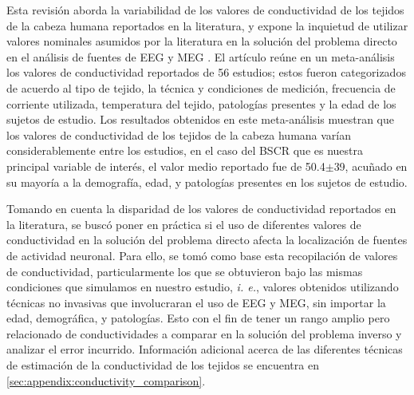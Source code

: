 Esta revisión aborda la variabilidad de los valores de conductividad de los tejidos de la cabeza humana reportados en la literatura, y expone la inquietud  de utilizar valores nominales asumidos por la literatura en la solución del problema directo en el análisis de fuentes de EEG y MEG \cite{McCann2019}.
El artículo reúne en un meta-análisis los valores de conductividad reportados de 56 estudios; estos fueron categorizados de acuerdo al tipo de tejido, la técnica y condiciones de medición, frecuencia de corriente utilizada, temperatura del tejido, patologías presentes y la edad de los sujetos de estudio.
Los resultados obtenidos en este meta-análisis muestran que los valores de conductividad de los tejidos de la cabeza humana varían considerablemente entre los estudios, en el caso del BSCR que es nuestra principal variable de interés, el valor medio reportado fue de 50.4$\mathbf{\pm}$39, acuñado en su mayoría a la demografía, edad, y patologías presentes en los sujetos de estudio.

Tomando en cuenta la disparidad de los valores de conductividad reportados en la literatura, se buscó poner en práctica si el uso de diferentes valores de conductividad en la solución del problema directo afecta la localización de fuentes de actividad neuronal.
Para ello, se tomó como base esta recopilación de valores de conductividad, particularmente los que se obtuvieron bajo las mismas condiciones que simulamos en nuestro estudio, \emph{i. e.}, valores obtenidos utilizando técnicas no invasivas que involucraran el uso de EEG y MEG, sin importar la edad, demográfica, y patologías.
Esto con el fin de tener un rango amplio pero relacionado de conductividades a comparar en la solución del problema inverso y analizar el error incurrido. Información adicional acerca de las diferentes técnicas de estimación de la conductividad de los tejidos se encuentra en \cref{sec:appendix:conductivity_comparison}.

